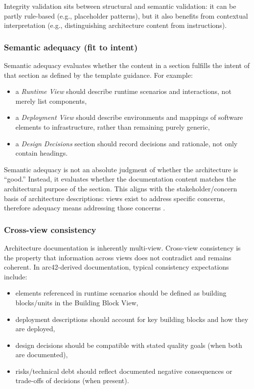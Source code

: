 Integrity validation sits between structural and semantic validation: it can be partly rule-based (e.g., placeholder patterns), but it also benefits from contextual interpretation (e.g., distinguishing architecture content from instructions).

\subsubsection{Semantic adequacy (fit to intent)}
Semantic adequacy evaluates whether the content in a section fulfills the intent of that section as defined by the template guidance. For example:
\begin{itemize}
    \item a \emph{Runtime View} should describe runtime scenarios and interactions, not merely list components,
    \item a \emph{Deployment View} should describe environments and mappings of software elements to infrastructure, rather than remaining purely generic,
    \item a \emph{Design Decisions} section should record decisions and rationale, not only contain headings.
\end{itemize}

Semantic adequacy is not an absolute judgment of whether the architecture is ``good.'' Instead, it evaluates whether the documentation content matches the architectural purpose of the section. This aligns with the stakeholder/concern basis of architecture descriptions: views exist to address specific concerns, therefore adequacy means addressing those concerns \cite{iso42010}.

\subsubsection{Cross-view consistency}
Architecture documentation is inherently multi-view. Cross-view consistency is the property that information across views does not contradict and remains coherent. In arc42-derived documentation, typical consistency expectations include:
\begin{itemize}
    \item elements referenced in runtime scenarios should be defined as building blocks/units in the Building Block View,
    \item deployment descriptions should account for key building blocks and how they are deployed,
    \item design decisions should be compatible with stated quality goals (when both are documented),
    \item risks/technical debt should reflect documented negative consequences or trade-offs of decisions (when present).
\end{itemize}

